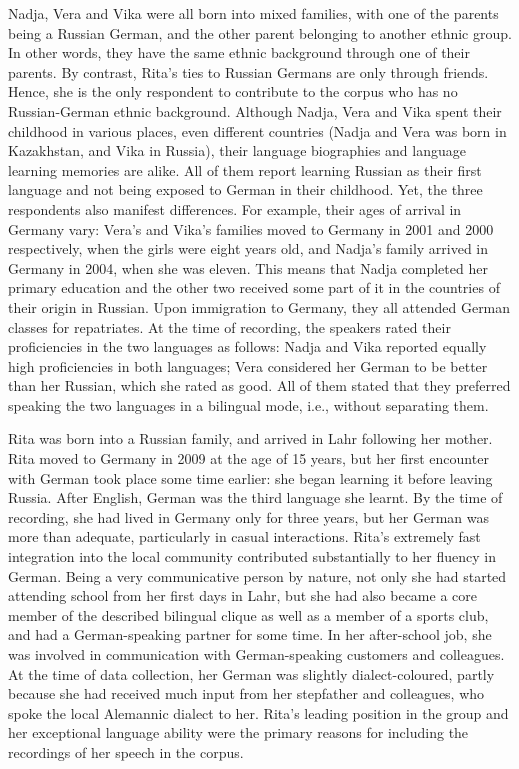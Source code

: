 Nadja, Vera and Vika were all born into mixed families, with one of the parents being a Russian German, and the other parent belonging to another ethnic group. In other words, they have the same ethnic background through one of their parents. By contrast, Rita's ties to Russian Germans are only through friends. Hence, she is the only respondent to contribute to the corpus who has no Russian-German ethnic background. Although Nadja, Vera and Vika spent their childhood in various places, even different countries (Nadja and Vera was born in Kazakhstan, and Vika in Russia), their language biographies and language learning memories are alike. All of them report learning Russian as their first language and not being exposed to German in their childhood. Yet, the three respondents also manifest differences. For example, their ages of arrival in Germany vary: Vera's and Vika's families moved to Germany in 2001 and 2000 respectively, when the girls were eight years old, and Nadja's family arrived in Germany in 2004, when she was eleven. This means that Nadja completed her primary education and the other two received some part of it in the countries of their origin in Russian. Upon immigration to Germany, they all attended German classes for repatriates. At the time of recording, the speakers rated their proficiencies in the two languages as follows: Nadja and Vika reported equally high proficiencies in both languages; Vera considered her German to be better than her Russian, which she rated as good. All of them stated that they preferred speaking the two languages in a bilingual mode, i.e., without separating them.

Rita was born into a Russian family, and arrived in Lahr following her mother. Rita moved to Germany in 2009 at the age of 15 years, but her first encounter with German took place some time earlier: she began learning it before leaving Russia. After English, German was the third language she learnt. By the time of recording, she had lived in Germany only for three years, but her German was more than adequate, particularly in casual interactions. Rita's extremely fast integration into the local community contributed substantially to her fluency in German. Being a very communicative person by nature, not only she had started attending school from her first days in Lahr, but she had also became a core member of the described bilingual clique as well as a member of a sports club, and had a German-speaking partner for some time. In her after-school job, she was involved in communication with German-speaking customers and colleagues. At the time of data collection, her German was slightly dialect-coloured, partly because she had received much input from her stepfather and colleagues, who spoke the local Alemannic dialect to her. Rita's leading position in the group and her exceptional language ability were the primary reasons for including the recordings of her speech in the corpus.

